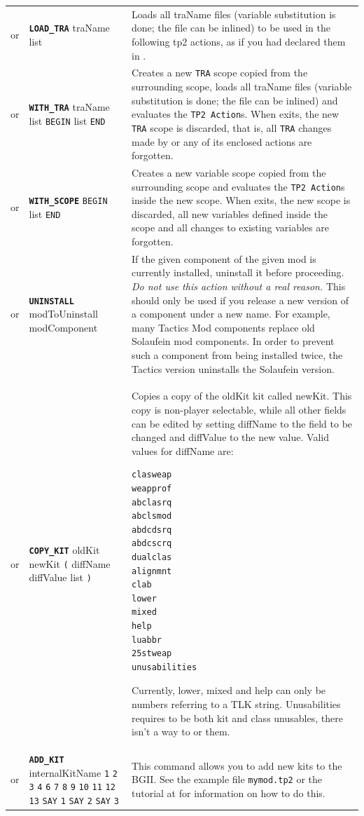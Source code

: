 \documentclass{article}
\def\ttref#1{\ahrefloc{#1}{\tt #1}}
\def\DEFINE#1{{\tt \bf #1}\label{#1}\index{#1}}
\def\t#1{{\tt #1}}
\def\Slist{{\color{red} list }}
\begin{document}
\begin{tabular}{cp{10in}|p{10in}}
  or & \DEFINE{LOAD_TRA} traName \Slist &
    Loads all traName files (variable substitution is done; the file can be inlined)
    to be used in the following tp2 actions, as if you had declared them in \ttref{LANGUAGE}. \\
  or & \DEFINE{WITH_TRA} traName \Slist \t{BEGIN} \ttref{TP2 Action} \Slist \t{END} &
    Creates a new \t{TRA} scope copied from the surrounding scope,
    loads all traName files (variable substitution is done; the file
    can be inlined) and evaluates the \t{TP2 Action}s.  When
    \ttref{WITH_TRA} exits, the new \t{TRA} scope is discarded, that
    is, all \t{TRA} changes made by \ttref{WITH_TRA} or any of its
    enclosed actions are forgotten. \\
  or & \DEFINE{WITH_SCOPE} \t{BEGIN} \ttref{TP2 Action} \Slist \t{END} &
    Creates a new variable scope copied from the surrounding scope
    and evaluates the \t{TP2 Action}s inside the new scope. When
    \ttref{WITH_SCOPE} exits, the new scope is discarded, all
    new variables defined inside the scope and all changes to existing variables
    are forgotten. \\
  or & \DEFINE{UNINSTALL} modToUninstall modComponent &
    If the given component of the given mod is currently installed,
    uninstall it before proceeding. \emph{Do not use this action without
	a real reason.} This
    should only be used if you release a new version of a component under a
    new name. For example, many Tactics Mod components replace old
    Solaufein mod components. In order to prevent such a component from
    being installed twice, the Tactics version uninstalls the Solaufein
    version.  \\
  or & \DEFINE{COPY_KIT} oldKit newKit \verb+(+ diffName diffValue \Slist
  \verb+)+ &
    Copies a copy of the oldKit kit called newKit. This copy is non-player
    selectable, while all other fields can be edited by setting diffName to
    the field to be changed and diffValue to the new value. Valid values for
    diffName are:
\begin{verbatim}
clasweap
weapprof
abclasrq
abclsmod
abdcdsrq
abdcscrq
dualclas
alignmnt
clab
lower
mixed
help
luabbr
25stweap
unusabilities
\end{verbatim}
    Currently, lower, mixed and help can only be numbers referring to a TLK
    string. Unusabilities requires to be both kit and class unusables, there
    isn't a way to \ttref{BAND} or \ttref{BOR} them.
    \\
  or & \DEFINE{ADD_KIT} internalKitName \t{\ttref{String}1}
       \t{\ttref{String}2} \t{\ttref{String}3} \t{\ttref{String}4}
       \t{\ttref{String}6} \t{\ttref{String}7} \t{\ttref{String}8}
       \t{\ttref{String}9} \t{\ttref{String}10} \t{\ttref{String}11}
       \t{\ttref{String}12} \t{\ttref{String}13} \t{SAY} \t{\ttref{text}1}
       \t{SAY} \t{\ttref{text}2} \t{SAY} \t{\ttref{text}3}
  &
    This command allows you to add new kits to the BGII.
    See the example file \t{mymod.tp2} or the tutorial at
    \ahrefurl{\url{http://gibberlings3.net/forums/index.php?showtopic=584}}
    for information on how to do this.


\end{tabular}
\end{document}
